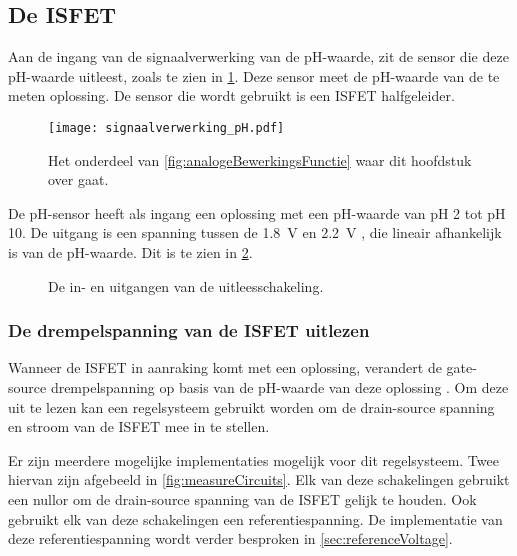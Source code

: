\subsection{De ISFET}

Aan de ingang van de signaalverwerking van de pH-waarde, zit de sensor die deze pH-waarde uitleest, zoals te zien in \cref{fig:pHInSchema}. Deze sensor meet de pH-waarde van de te meten oplossing. De sensor die wordt gebruikt is een ISFET halfgeleider.
\begin{figure}[!htb]
    \centering
    \texttt{[image: signaalverwerking\_pH.pdf]}
    \caption{Het onderdeel van \cref{fig:analogeBewerkingsFunctie} waar dit hoofdstuk over gaat.}
    \label{fig:pHInSchema}
\end{figure}

De pH-sensor heeft als ingang een oplossing met een pH-waarde van pH 2 tot pH 10. De uitgang is een spanning tussen de \qty{1.8}{\volt} en \qty{2.2}{\volt} \cite{isfet}, die lineair afhankelijk is van de pH-waarde. Dit is te zien in \cref{fig:uitleesBlok}.

\begin{figure}[!htb]
    \centering
    \def\svgwidth{0.4\textwidth}
    
    \caption{De in- en uitgangen van de uitleesschakeling.}
    \label{fig:uitleesBlok}
\end{figure}


\subsubsection{De drempelspanning van de ISFET uitlezen} \label{sec:ISFETLees}
Wanneer de ISFET in aanraking komt met een oplossing, verandert de gate-source drempelspanning op basis van de pH-waarde van deze oplossing \cite{bergveld2003thirtyYearsISFET,bergveld1985impactOfMosfetBasedSensors}. Om deze uit te lezen kan een regelsysteem gebruikt worden om de drain-source spanning en stroom van de ISFET mee in te stellen.

Er zijn meerdere mogelijke implementaties mogelijk voor dit regelsysteem. Twee hiervan zijn afgebeeld in \cref{fig:measureCircuits}.
Elk van deze schakelingen gebruikt een nullor om de drain-source spanning van de ISFET gelijk te houden. Ook gebruikt elk van deze schakelingen een referentiespanning. De implementatie van deze referentiespanning wordt verder besproken in \cref{sec:referenceVoltage}.


